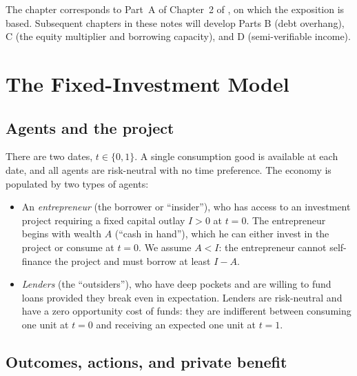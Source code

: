 \documentclass[11pt,a4paper,oneside]{book}
\theoremstyle{plain}
\theoremstyle{definition}
\theoremstyle{remark}
\numberwithin{equation}{chapter}
\begin{document}
The chapter corresponds to Part~A of Chapter~2 of \citet{Tirole2006}, on which the exposition is based.
Subsequent chapters in these notes will develop Parts B (debt overhang), C (the equity multiplier and borrowing capacity), and D (semi-verifiable income).

\section{The Fixed-Investment Model}
\label{sec:HT-model}

\subsection{Agents and the project}

There are two dates, $t \in \{0, 1\}$.
A single consumption good is available at each date, and all agents are risk-neutral with no time preference.
The economy is populated by two types of agents:
\begin{itemize}
  \item An \emph{entrepreneur} (the borrower or ``insider''), who has access to an investment project requiring a fixed capital outlay $I > 0$ at $t=0$.
  The entrepreneur begins with wealth $A$ (``cash in hand''), which he can either invest in the project or consume at $t=0$.
  We assume $A < I$: the entrepreneur cannot self-finance the project and must borrow at least $I - A$.
  \item \emph{Lenders} (the ``outsiders''), who have deep pockets and are willing to fund loans provided they break even in expectation.
  Lenders are risk-neutral and have a zero opportunity cost of funds: they are indifferent between consuming one unit at $t=0$ and receiving an expected one unit at $t=1$.
\end{itemize}

\subsection{Outcomes, actions, and private benefit}
\end{document}
